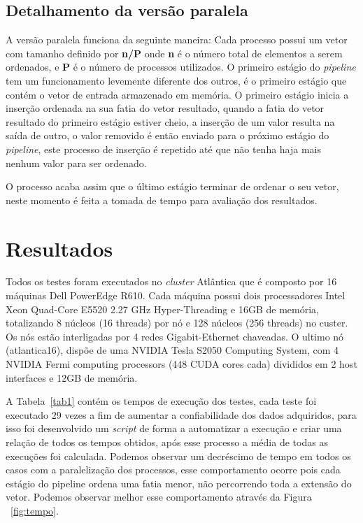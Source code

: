\documentclass[portuguese, conference]{IEEEtran}
\begin{document}
\subsection{Detalhamento da versão paralela}
A versão paralela funciona da seguinte maneira: Cada processo possui um vetor com tamanho definido por \textbf{n/P} onde \textbf{n} é o número total de elementos a serem ordenados, e \textbf{P} é o número de processos utilizados. O primeiro estágio do {\it pipeline} tem um funcionamento levemente diferente dos outros, é o primeiro estágio que contém o vetor de entrada armazenado em memória. O primeiro estágio inicia a inserção ordenada na sua fatia do vetor resultado, quando a fatia do vetor resultado do primeiro estágio estiver cheio, a inserção de um valor resulta na saída de outro, o valor removido é então enviado para o próximo estágio do {\it pipeline}, este processo de inserção é repetido até que não tenha haja mais nenhum valor para ser ordenado. 

O processo acaba assim que o último estágio terminar de ordenar o seu vetor, neste momento é feita a tomada de tempo para avaliação dos resultados.

\section{Resultados}
Todos os testes foram executados no {\it cluster} Atlântica que é composto por 16 máquinas Dell PowerEdge R610. Cada máquina possui dois processadores Intel Xeon Quad-Core E5520 2.27 GHz Hyper-Threading e 16GB de memória, totalizando 8 núcleos (16 threads) por nó e 128 núcleos (256 threads) no custer. Os nós estão interligadas por 4 redes Gigabit-Ethernet chaveadas. O ultimo nó (atlantica16), dispõe de uma NVIDIA Tesla S2050 Computing System, com 4 NVIDIA Fermi computing processors (448 CUDA cores cada) divididos em 2 host interfaces e 12GB de memória.~\cite{IDE15}

A Tabela~\ref{tab1} contém os tempos de execução dos testes, cada teste foi executado 29 vezes a fim de aumentar a confiabilidade dos dados adquiridos, para isso foi desenvolvido um {\it script} de forma a automatizar a execução  e criar uma relação de todos os tempos obtidos, após esse processo a média de todas as execuções foi calculada. Podemos observar um decréscimo de tempo em todos os casos com a paralelização dos processos, esse comportamento ocorre pois cada estágio do pipeline ordena uma fatia menor, não percorrendo toda a extensão do vetor. Podemos observar melhor esse comportamento através da Figura ~\ref{fig:tempo}.
\end{document}
